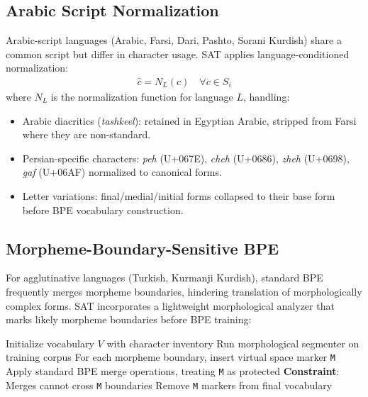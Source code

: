 \documentclass[11pt,twocolumn]{article}
\begin{document}
\subsection{Arabic Script Normalization}

Arabic-script languages (Arabic, Farsi, Dari, Pashto, Sorani Kurdish) share a
common script but differ in character usage. SAT applies language-conditioned
normalization:
\begin{align}
  \hat{c} = N_L(c) \quad \forall c \in S_i
\end{align}
where $N_L$ is the normalization function for language $L$, handling:
\begin{itemize}[leftmargin=*,noitemsep]
  \item Arabic diacritics (\textit{tashkeel}): retained in Egyptian Arabic,
        stripped from Farsi where they are non-standard.
  \item Persian-specific characters: \textit{peh} (U+067E), \textit{cheh} (U+0686),
        \textit{zheh} (U+0698), \textit{gaf} (U+06AF) normalized to canonical forms.
  \item Letter variations: final/medial/initial forms collapsed to their base
        form before BPE vocabulary construction.
\end{itemize}

\subsection{Morpheme-Boundary-Sensitive BPE}

For agglutinative languages (Turkish, Kurmanji Kurdish), standard BPE
frequently merges morpheme boundaries, hindering translation of morphologically
complex forms. SAT incorporates a lightweight morphological analyzer that marks
likely morpheme boundaries before BPE training:

\begin{algorithm}[h]
\caption{SAT-BPE Training for Agglutinative Languages}
\begin{algorithmic}[1]
\State Initialize vocabulary $V$ with character inventory
\State Run morphological segmenter on training corpus
\State For each morpheme boundary, insert virtual space marker \texttt{\textvisiblespace{}M}
\State Apply standard BPE merge operations, treating \texttt{\textvisiblespace{}M} as protected
\State \textbf{Constraint}: Merges cannot cross \texttt{\textvisiblespace{}M} boundaries
\State Remove \texttt{\textvisiblespace{}M} markers from final vocabulary
\end{algorithmic}
\end{algorithm}
\end{document}
